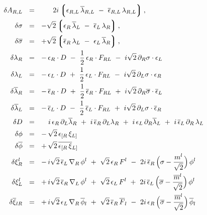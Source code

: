\documentclass[12pt]{article}
\newcommand{\p}{\partial}
\newcommand{\ov}{\overline}
\newcommand{\lgr}{\left\lgroup}
\newcommand{\rgr}{\right\rgroup}
\newcommand{\lar}{\lambda_R}
\newcommand{\lal}{\lambda_L}
\newcommand{\larl}{\lambda_{R,L}}
\newcommand{\blar}{\ov{\lambda}{}_R}
\newcommand{\blal}{\ov{\lambda}{}_L}
\newcommand{\blarl}{\ov{\lambda}{}_{R,L}}
\newcommand{\eer}{\epsilon_R}
\newcommand{\eel}{\epsilon_L}
\newcommand{\eerl}{\epsilon_{R,L}}
\newcommand{\beer}{\ov{\epsilon}{}_R}
\newcommand{\beel}{\ov{\epsilon}{}_L}
\newcommand{\beerl}{\ov{\epsilon}{}_{R,L}}
\begin{document}
\begin{align}
%
\notag
  \delta A_{R,L} & ~~=~~ ~~~~~ 2i \lgr  \eerl\, \blarl
                              ~-~ \beerl\, \larl \rgr  , \\
%
\notag
  \delta\sigma & ~~=~~ -\sqrt{2}
                              \lgr \eer\, \blal ~-~ \beel\,\lar \rgr , 
                              \\
%
\notag
  \delta\ov{\sigma} & ~~=~~ +\sqrt{2}
                              \lgr \beer\,\lal ~-~ \eel\,\blar \rgr ,
                              \\
%
\notag
  \delta\lar & ~~=~~ -\,\eer\cdot D ~-~ \frac{1}{2}\,\eer\cdot F_{RL} 
                     ~-~ i\sqrt{2}\, \p_R\sigma \cdot \eel
                     \\
%
\notag
  \delta\lal & ~~=~~ -\,\eel\cdot D ~+~ \frac{1}{2}\,\eel\cdot F_{RL} 
                     ~-~ i\sqrt{2}\, \p_L\sigma \cdot \eer
                     \\
%
\notag
  \delta\blar & ~~=~~ -\,\beer\cdot D ~+~ \frac{1}{2}\,\beer\cdot F_{RL} 
                     ~+~ i\sqrt{2}\, \p_R\ov{\sigma} \cdot \beel
                     \\
%
\notag
  \delta\blal & ~~=~~ -\,\beel\cdot D ~-~ \frac{1}{2}\,\beel\cdot F_{RL}
                     ~+~ i\sqrt{2}\, \p_L\sigma \cdot \beer
                     \\
%
\notag
  \delta D & ~~=~~ ~~~i\,\eer\, \p_L \blar ~+~ i\,\beer\, \p_L\lar 
                   ~+~ i\,\eel\, \p_R \blal ~+~ i\,\beel\,\p_R\,\lal
                   \\
%
\label{msusy}
  \delta\phi & ~~=~~ -\,\sqrt{2}\, \epsilon_{[R}\, \xi_{L]} 
                   \\
%
\notag
  \delta\ov{\phi} & ~~=~~ +\,\sqrt{2}\,\ov{\epsilon_{[R}\, \xi}{}_{L]}
                   \\
%
\notag
  \delta\xi_R^l & ~~=~~
     -\, i\sqrt{2}\, \beel\, \nabla_R\, \phi^l ~+~ \sqrt{2}\, \eer\, F^l 
     ~-~ 2i\, \beer\, \Bigl(\sigma - \frac{m^l}{\sqrt{2}}\Bigr)\, \phi^l
     \\
%
\notag
  \delta\xi_L^l & ~~=~~
     +\, i\sqrt{2}\, \beer\, \nabla_L\, \phi^l ~+~ \sqrt{2}\, \eel\, F^l
     ~+~ 2i\, \beel\, \Bigl(\ov{\sigma} - \frac{\ov{m}{}^l}{\sqrt{2}}\Bigr)\, \phi^l
     \\
%
\notag
  \delta\ov{\xi}{}_{lR} & ~~=~~
     +\, i\sqrt{2}\, \eel\, \nabla_R\, \ov{\phi}{}_l 
     ~+~ \sqrt{2}\, \beer\, \ov{F}{}_l 
     ~-~ 2i\, \eer\, \Bigl(\ov{\sigma} - \frac{\ov{m}{}^l}{\sqrt{2}}\Bigr)\, \ov{\phi}{}_l

\end{align}
\end{document}
